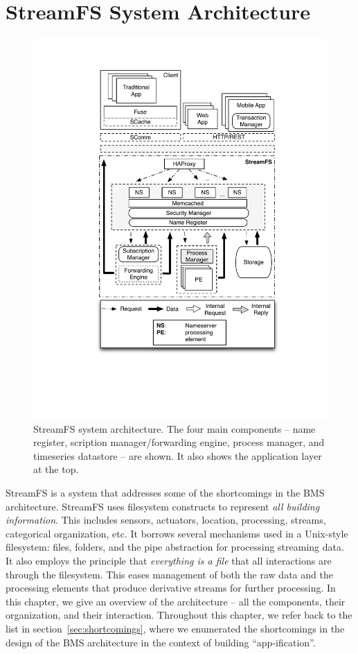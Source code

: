 \chapter{StreamFS System Architecture}
\label{chap:SFSArchMain}



\begin{figure}[th!] %
\centering
\includegraphics[width=0.65\columnwidth]{figs/sfsarch}
\caption{StreamFS system architecture.  The four main components -- name register, scription manager/forwarding engine, 
process manager, and timeseries datastore -- are shown.  It also shows the application layer at the top.}
\label{fig:sfsarch}
\end{figure}

StreamFS is a system that addresses some of the shortcomings in the BMS architecture.  StreamFS uses filesystem
constructs to represent \emph{all building information}.  This includes sensors, actuators, location, processing, 
streams, categorical organization, etc.  It borrows several mechanisms used in a Unix-style filesystem: files, folders,
and the pipe abstraction for processing streaming data.  It also employs the principle that \emph{everything is a file} 
that all interactions are through the filesystem.
This eases management of both the raw data and the processing elements that produce derivative streams for further processing.
In this chapter, we give an overview of the architecture -- all the components, their organization, and their interaction.
Throughout this chapter, we refer back to the list in section~\ref{sec:shortcomings}, where we enumerated the shortcomings
in the design of the BMS architecture in the context of building ``app-ification''.


